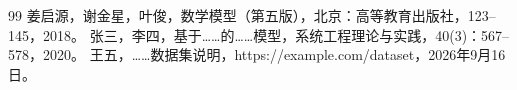 \begin{thebibliography}{99}
      姜启源，谢金星，叶俊，数学模型（第五版），北京：高等教育出版社，123--145，2018。
   张三，李四，基于……的……模型，系统工程理论与实践，40(3)：567--578，2020。
       王五，……数据集说明，https://example.com/dataset，2026年9月16日。
\end{thebibliography}
